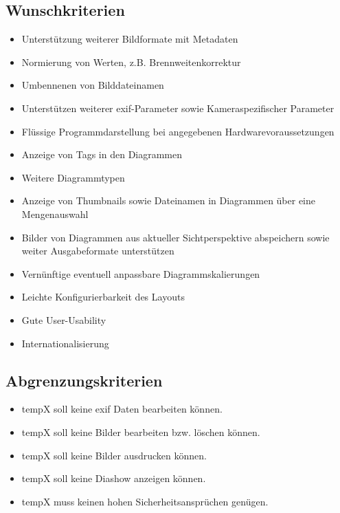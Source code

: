 \subsection{Wunschkriterien} 
\begin{itemize}
  \item Unterstützung weiterer Bildformate mit Metadaten
	\item Normierung von Werten, z.B. Brennweitenkorrektur
	\item Umbennenen von Bilddateinamen
	\item Unterstützen weiterer \gls{exif}-Parameter sowie Kameraspezifischer Parameter
	\item Flüssige Programmdarstellung bei angegebenen Hardwarevoraussetzungen
	\item Anzeige von Tags in den Diagrammen
	\item Weitere Diagrammtypen
	\item Anzeige von Thumbnails sowie Dateinamen in Diagrammen über eine Mengenauswahl
	\item Bilder von Diagrammen aus aktueller Sichtperspektive abspeichern sowie weiter Ausgabeformate unterstützen 
	\item Vernünftige eventuell anpassbare Diagrammskalierungen
	\item Leichte Konfigurierbarkeit des Layouts
	\item Gute User-Usability
	\item Internationalisierung
\end{itemize}

\subsection{Abgrenzungskriterien} 
\begin{itemize}
	\item \gls{tempX} soll keine \gls{exif} Daten bearbeiten können.
	\item \gls{tempX} soll keine Bilder bearbeiten bzw. löschen können.
	\item \gls{tempX} soll keine Bilder ausdrucken können.
	\item \gls{tempX} soll keine Diashow anzeigen können.
	\item \gls{tempX} muss keinen hohen Sicherheitsansprüchen genügen.
\end{itemize}
